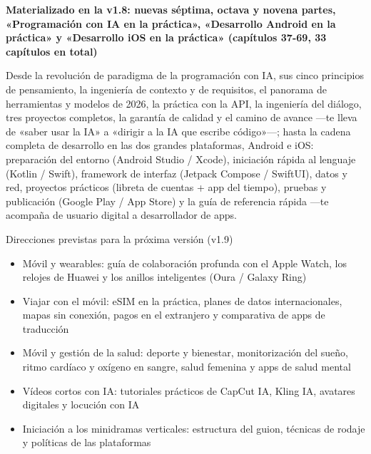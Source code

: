 

\textbf{Materializado en la v1.8: nuevas séptima, octava y novena partes, «Programación con IA en la práctica», «Desarrollo Android en la práctica» y «Desarrollo iOS en la práctica» (capítulos 37-69, 33 capítulos en total)}\par

Desde la revolución de paradigma de la programación con IA, sus cinco principios de pensamiento, la ingeniería de contexto y de requisitos, el panorama de herramientas y modelos de 2026, la práctica con la API, la ingeniería del diálogo, tres proyectos completos, la garantía de calidad y el camino de avance —te lleva de «saber usar la IA» a «dirigir a la IA que escribe código»—; hasta la cadena completa de desarrollo en las dos grandes plataformas, Android e iOS: preparación del entorno (Android Studio / Xcode), iniciación rápida al lenguaje (Kotlin / Swift), framework de interfaz (Jetpack Compose / SwiftUI), datos y red, proyectos prácticos (libreta de cuentas + app del tiempo), pruebas y publicación (Google Play / App Store) y la guía de referencia rápida —te acompaña de usuario digital a desarrollador de apps.

\begin{tcbinfo}{Direcciones previstas para la próxima versión (v1.9)}
\begin{itemize}
  \item Móvil y wearables: guía de colaboración profunda con el Apple Watch, los relojes de Huawei y los anillos inteligentes (Oura / Galaxy Ring)
  \item Viajar con el móvil: eSIM en la práctica, planes de datos internacionales, mapas sin conexión, pagos en el extranjero y comparativa de apps de traducción
  \item Móvil y gestión de la salud: deporte y bienestar, monitorización del sueño, ritmo cardíaco y oxígeno en sangre, salud femenina y apps de salud mental
  \item Vídeos cortos con IA: tutoriales prácticos de CapCut IA, Kling IA, avatares digitales y locución con IA
  \item Iniciación a los minidramas verticales: estructura del guion, técnicas de rodaje y políticas de las plataformas
\end{itemize}

\end{tcbinfo}

